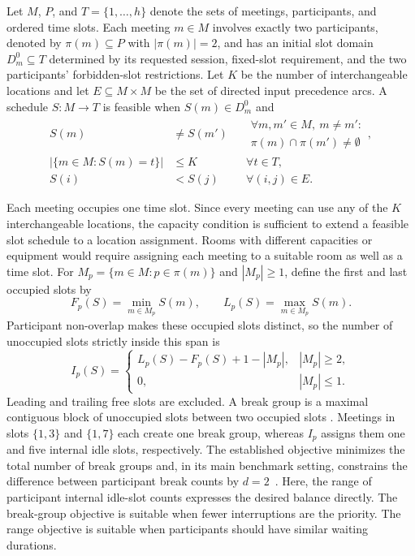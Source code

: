 \documentclass[conference,a4paper]{IEEEtran}
\newcommand{\revised}[1]{#1}
\begin{document}
Let $M$, $P$, and $T=\{1,\ldots,h\}$ denote the sets of meetings, participants, and ordered time slots.  Each meeting $m\in M$ involves exactly two participants, denoted by $\pi(m)\subseteq P$ with $|\pi(m)|=2$, and has an initial slot domain $D_m^0\subseteq T$ determined by its requested session, fixed-slot requirement, and the two participants' forbidden-slot restrictions. Let $K$ be the number of interchangeable locations and let $E\subseteq M\times M$ be the set of directed input precedence arcs.  A schedule $S:M\rightarrow T$ is feasible when $S(m)\in D_m^0$ and
\begin{align}
S(m)&\ne S(m') &&
  \substack{\forall m,m'\in M,\ m\ne m':\\
  \pi(m)\cap\pi(m')\ne\emptyset}, \label{eq:participant}\\
\left|\{m\in M:S(m)=t\}\right|&\le K &&
  \forall t\in T, \label{eq:capacity}\\
S(i)&<S(j) &&
  \forall(i,j)\in E. \label{eq:precedence}
\end{align}

\revised{Each meeting occupies one time slot.  Since every meeting can use any of the $K$ interchangeable locations, the capacity condition is sufficient to extend a feasible slot schedule to a location assignment. Rooms with different capacities or equipment would require assigning each meeting to a suitable room as well as a time slot. For $M_p=\{m\in M:p\in\pi(m)\}$ and $|M_p|\geq1$, define the first and last occupied slots by}
\begin{equation*}
F_p(S)=\min_{m\in M_p}S(m),\qquad
L_p(S)=\max_{m\in M_p}S(m).
\end{equation*}
Participant non-overlap makes these occupied slots distinct, so the number of unoccupied slots strictly inside this span is
\begin{equation}
I_p(S)=
\begin{cases}
L_p(S)-F_p(S)+1-|M_p|, & |M_p|\ge 2,\\
0, & |M_p|\le 1.
\end{cases}
\label{eq:internal-idle}
\end{equation}
\revised{Leading and trailing free slots are excluded.  A break group is a maximal contiguous block of unoccupied slots between two occupied slots \cite{bofill2022}.  Meetings in slots $\{1,3\}$ and $\{1,7\}$ each create one break group, whereas $I_p$ assigns them one and five internal idle slots, respectively.  The established objective minimizes the total number of break groups and, in its main benchmark setting, constrains the difference between participant break counts by $d=2$~\cite{bofill2022}.  Here, the range of participant internal idle-slot counts expresses the desired balance directly. The break-group objective is suitable when fewer interruptions are the priority. The range objective is suitable when participants should have similar waiting durations.}
\end{document}
